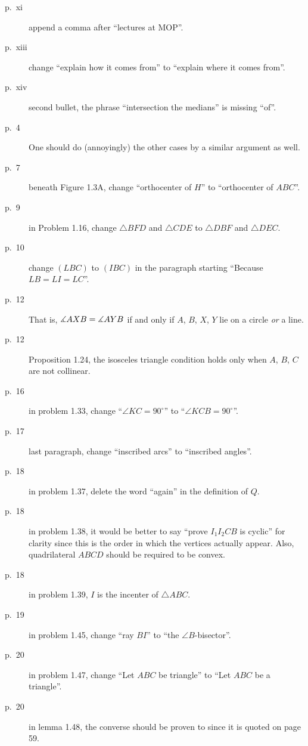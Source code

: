 \documentclass[11pt]{scrartcl}
\begin{document}
\begin{description}

\item[p.\  xi] append a comma after ``lectures at MOP''.
\item[p.\  xiii] change ``explain how it comes from'' to ``explain where it comes from''.
\item[p.\  xiv] second bullet, the phrase ``intersection the medians'' is missing ``of''.
\item[p.\   4] 
  One should do (annoyingly) the other cases by a similar argument as well.
\item[p.\   7] beneath Figure 1.3A, change ``orthocenter of $H$'' to ``orthocenter of $ABC$''.
\item[p.\   9] in Problem 1.16, change $\triangle BFD$ and $\triangle CDE$
  to $\triangle DBF$ and $\triangle DEC$.
\item[p.\  10] change $(LBC)$ to $(IBC)$ in the paragraph starting ``Because $LB=LI=LC$''.
\item[p.\  12] 
  That is, $\measuredangle AXB = \measuredangle AYB$ if and only if $A$, $B$, $X$, $Y$ lie on
  a circle \emph{or} a line.
\item[p.\  12] Proposition 1.24, the isosceles triangle condition holds
  only when $A$, $B$, $C$ are not collinear.
\item[p.\  16] in problem 1.33, change ``$\angle KC=90^{\circ}$'' to ``$\angle KCB=90^{\circ}$''.
\item[p.\  17] last paragraph, change ``inscribed arcs'' to ``inscribed angles''.
\item[p.\  18] in problem 1.37, delete the word ``again'' in the definition of $Q$.
\item[p.\  18] in problem 1.38, it would be better to say
  ``prove $I_1 I_2 C B$ is cyclic'' for clarity
  since this is the order in which the vertices actually appear.
  Also, quadrilateral $ABCD$ should be required to be convex.
\item[p.\  18] in problem 1.39, $I$ is the incenter of $\triangle ABC$.
\item[p.\  19] in problem 1.45, change ``ray $BI$'' to ``the $\angle B$-bisector''.
\item[p.\  20] in problem 1.47, change ``Let $ABC$ be triangle'' to ``Let $ABC$ be a triangle''.
\item[p.\  20] in lemma 1.48, the converse should be proven to since it is quoted on page 59.

\end{description}
\end{document}
